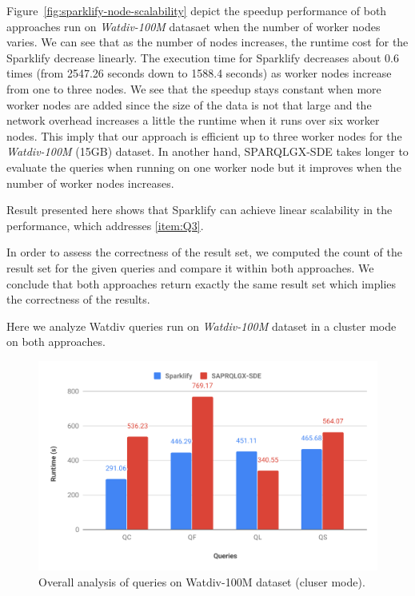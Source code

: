 Figure~\ref{fig:sparklify-node-scalability} depict the speedup performance of both approaches run on \textit{Watdiv-100M} datasaet when the number of worker nodes varies.
We can see that as the number of nodes increases, the runtime cost for the Sparklify decrease linearly.
The execution time for Sparklify decreases about 0.6 times (from 2547.26 seconds down to 1588.4 seconds) as worker nodes increase from one to three nodes.
We see that the speedup stays constant when more worker nodes are added since the size of the data is not that large and the network overhead increases a little the runtime when it runs over six worker nodes.
This imply that our approach is efficient up to three worker nodes for the \textit{Watdiv-100M} (15GB) dataset.
In another hand, SPARQLGX-SDE takes longer to evaluate the queries when running on one worker node but it improves when the number of worker nodes increases.

Result presented here shows that Sparklify can achieve linear scalability in the performance, which addresses \ref{item:Q3}.

In order to assess the correctness of the result set, we computed the count of the result set for the given queries and compare it within both approaches.
We conclude that both approaches return exactly the same result set which implies the correctness of the results.

Here we analyze Watdiv queries run on \textit{Watdiv-100M} dataset in a cluster mode on both approaches.

\begin{figure}
  \includegraphics[width=1.0\columnwidth]{images/6_scalable_rdf_querying/sparklify-overall-analysis.pdf}
    \caption{Overall analysis of queries on Watdiv-100M dataset (cluser mode).}
    \label{fig:sparklify-overall-analysis}
\end{figure}

